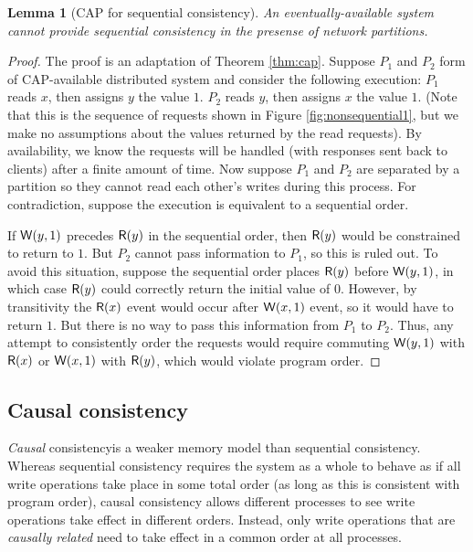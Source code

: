 \documentclass[]             %
{NASA}                       %
\newtheorem{lemma}[theorem]{Lemma}
\theoremstyle{definition}
\begin{document}
\begin{lemma}[CAP for sequential consistency]
  \label{thm:cap-sequential}
  An eventually-available system cannot provide sequential consistency in the presense of network partitions.
\end{lemma}
\begin{proof}
  The proof is an adaptation of Theorem \ref{thm:cap}. Suppose $P_1$ and
  $P_2$ form of CAP-available distributed system and consider the
  following execution: $P_1$ reads $x$, then assigns $y$ the value
  $1$. $P_2$ reads $y$, then assigns $x$ the value $1$. (Note that this
  is the sequence of requests shown in Figure \ref{fig:nonsequential1},
  but we make no assumptions about the values returned by the read
  requests). By availability, we know the requests will be handled (with
  responses sent back to clients) after a finite amount of time. Now
  suppose $P_1$ and $P_2$ are separated by a partition so they cannot
  read each other's writes during this process. For contradiction,
  suppose the execution is equivalent to a sequential order.

  If $\mathsf{W}\!\left(y, 1\right)$ precedes $\mathsf{R}\!\left(y\right)$ in the sequential order, then $\mathsf{R}\!\left(y\right)$ would
  be constrained to return to $1$. But $P_2$ cannot pass information to
  $P_1$, so this is ruled out. To avoid this situation, suppose the
  sequential order places $\mathsf{R}\!\left(y\right)$ before $\mathsf{W}\!\left(y, 1\right)$, in which case $\mathsf{R}\!\left(y\right)$
  could correctly return the initial value of $0$. However, by
  transitivity the $\mathsf{R}\!\left(x\right)$ event would occur after $\mathsf{W}\!\left(x, 1\right)$ event, so it
  would have to return $1$. But there is no way to pass this information
  from $P_1$ to $P_2$. Thus, any attempt to consistently order the
  requests would require commuting $\mathsf{W}\!\left(y, 1\right)$ with $\mathsf{R}\!\left(x\right)$ or $\mathsf{W}\!\left(x, 1\right)$ with
  $\mathsf{R}\!\left(y\right)$, which would violate program order.
\end{proof}

\subsection{Causal consistency}
\label{causal-consistency}

\emph{Causal} consistency\citationneeded is a weaker memory model than
sequential consistency. Whereas sequential consistency requires the
system as a whole to behave as if all write operations take place in
some total order (as long as this is consistent with program order),
causal consistency allows different processes to see write operations
take effect in different orders. Instead, only write operations that
are \emph{causally related} need to take effect in a common order
at all processes.
\end{document}
